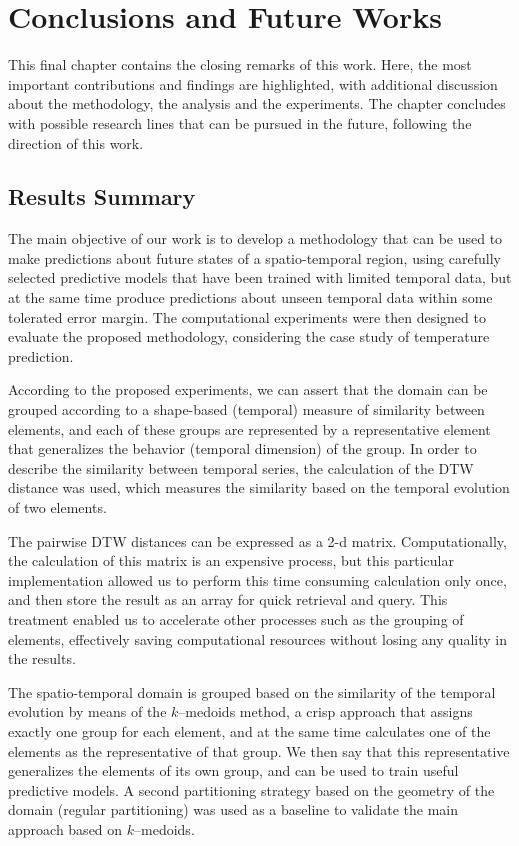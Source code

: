 \chapter{Conclusions and Future Works}
\label{chapter_Conclusions}

This final chapter contains the closing remarks of this work. Here, the most important contributions and findings are highlighted, with additional discussion about the methodology, the analysis and the experiments. The chapter concludes with possible research lines that can be pursued in the future, following the direction of this work.
	
\section{Results Summary}
\label{Sec:ResultsSummary}

The main objective of our work is to develop a methodology that can be used to make predictions about future states of a spatio-temporal region, using carefully selected predictive models that have been trained with limited temporal data, but at the same time produce predictions about unseen temporal data within some tolerated error margin. The computational experiments were then designed to evaluate the proposed methodology, considering the case study of temperature prediction.

According to the proposed experiments, we can assert that the domain can be grouped according to a shape-based (temporal) measure of similarity between elements, and each of these groups are represented by a representative element that generalizes the behavior (temporal dimension) of the group. In order to describe the similarity between temporal series, the calculation of the DTW distance was used, which measures the similarity based on the temporal evolution of two elements.

The pairwise DTW distances can be expressed as a 2-d matrix. Computationally, the calculation of this matrix is an expensive process, but this particular implementation allowed us to perform this time consuming calculation only once, and then store the result as an array for quick retrieval and query. This treatment enabled us to accelerate other processes such as the grouping of elements, effectively saving computational resources without losing any quality in the results.

The spatio-temporal domain is grouped based on the similarity of the temporal evolution by means of the $k$--medoids method, a crisp approach that assigns exactly one group for each element, and at the same time calculates one of the elements as the representative of that group. We then say that this representative generalizes the elements of its own group, and can be used to train useful predictive models. A second partitioning strategy based on the geometry of the domain (regular partitioning) was used as a baseline to validate the main approach based on $k$--medoids.

